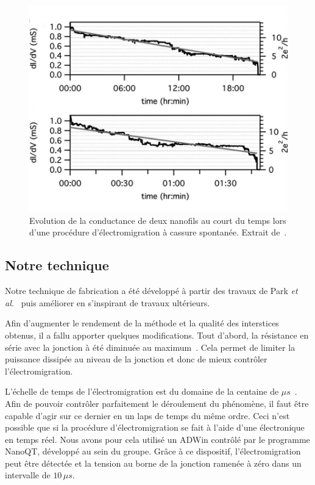 \begin{figure}[h!]
\parbox{7cm}{
\includegraphics[scale=0.45]{Fabrication/ElecMigExemp/ZantFig.pdf} 
}
\parbox{5cm}{\caption{Evolution de la conductance de deux nanofils au court du temps lors d'une procédure d'électromigration à cassure spontanée. Extrait de~\cite{ONeill2007}.}
\label{ParkExemp}
}
\end{figure}



\subsection{Notre technique}
Notre technique de fabrication a été développé à partir des travaux de Park \textit{et al.}~\cite{Park1999} puis améliorer en s'inspirant de travaux ultérieurs.

Afin d'augmenter le rendement de la méthode et la qualité des interstices obtenus, il a fallu apporter quelques modifications. Tout d’abord, la résistance en série avec la jonction à été diminuée au maximum~\cite{Zant2006,Trouwborst2006,Taychatanapat2007}. Cela permet de limiter la puissance dissipée au niveau de la jonction et donc de mieux contrôler l'électromigration.

L'échelle de temps de l'électromigration est du domaine de la centaine de $\mu s$~\cite{ONeill2007}. Afin de pouvoir contrôler parfaitement le déroulement du phénomène, il faut être capable d'agir sur ce dernier en un laps de temps du même ordre. Ceci n'est possible que si la procédure d'électromigration se fait à l'aide d'une électronique en temps réel. Nous avons pour cela utilisé un ADWin contrôlé par le programme NanoQT, développé au sein du groupe. Grâce à ce dispositif, l'électromigration peut être détectée et la tension au borne de la jonction ramenée à zéro dans un intervalle de $10\, \mu s$.

